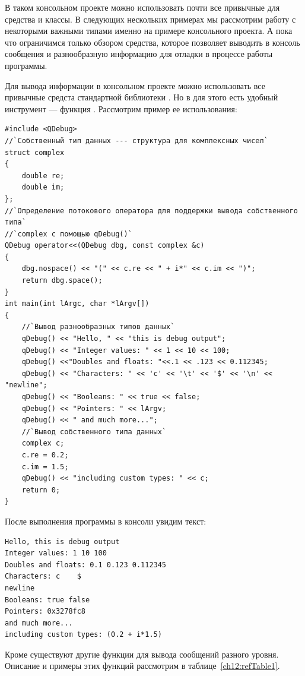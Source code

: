 В таком консольном проекте можно использовать почти все привычные для  средства и классы. В следующих
нескольких примерах мы рассмотрим работу с некоторыми важными типами  именно на примере
консольного проекта. А пока что ограничимся только обзором средства, которое позволяет выводить в консоль сообщения и
разнообразную информацию для отладки в процессе работы программы.

Для вывода информации в консольном  проекте можно использовать все привычные средста
стандартной библиотеки . Но в  для этого есть удобный инструмент --- функция
. Рассмотрим пример ее использования:
\begin{lstlisting}
#include <QDebug>
//`Собственный тип данных --- структура для комплексных чисел`
struct complex
{
    double re;
    double im;
};
//`Определение потокового оператора для поддержки вывода собственного типа`
//`complex с помощью qDebug()`
QDebug operator<<(QDebug dbg, const complex &c)
{
    dbg.nospace() << "(" << c.re << " + i*" << c.im << ")";
    return dbg.space();
}
int main(int lArgc, char *lArgv[])
{
    //`Вывод разнообразных типов данных`
    qDebug() << "Hello, " << "this is debug output";
    qDebug() << "Integer values: " << 1 << 10 << 100;
    qDebug() <<"Doubles and floats: "<<.1 << .123 << 0.112345;
    qDebug() << "Characters: " << 'c' << '\t' << '$' << '\n' << "newline";
    qDebug() << "Booleans: " << true << false;
    qDebug() << "Pointers: " << lArgv;
    qDebug() << " and much more...";
    //`Вывод собственного типа данных`
    complex c;
    c.re = 0.2;
    c.im = 1.5;
    qDebug() << "including custom types: " << c;
    return 0;
}
\end{lstlisting}

После выполнения программы в консоли увидим текст:
\begin{verbatim}
Hello, this is debug output 
Integer values: 1 10 100 
Doubles and floats: 0.1 0.123 0.112345 
Characters: c    $ 
newline 
Booleans: true false 
Pointers: 0x3278fc8 
and much more... 
including custom types: (0.2 + i*1.5)
\end{verbatim} 

Кроме  существуют другие функции для вывода сообщений разного уровня.
Описание и примеры этих функций рассмотрим в таблице~\ref{ch12:refTable1}.

